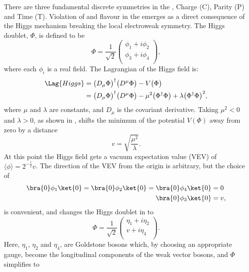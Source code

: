 There are three fundamental discrete symmetries in the \sm, Charge (C), Parity (P) and Time (T).
Violation of \CP and flavour in the \sm emerges as a direct consequence of the Higgs mechanism
breaking the local electroweak symmetry.
The Higgs doublet, $\Phi$, is defined to be
\begin{equation}
  \Phi = \frac{1}{\sqrt{2}}
  \begin{pmatrix}
    \phi_1 + i\phi_2 \\
    \phi_3 + i\phi_4 \\
  \end{pmatrix},
  \label{eq:th:phi}
\end{equation}
where each $\phi_i$ is a real field.
The Lagrangian of the Higgs field is:
\begin{align}
  \Lag{Higgs}
  &= \big(D_\mu\Phi\big)^\dagger\big(D^\mu\Phi\big) - V\big(\Phi\big) \nonumber\\
  &= \big(D_\mu\Phi\big)^\dagger\big(D^\mu\Phi\big) - \mu^2\big(\Phi^\dagger\Phi\big) +
  \lambda\big(\Phi^\dagger\Phi\big)^{2},
  \label{eq:th:laghiggs1}
\end{align}
where $\mu$ and $\lambda$ are constants, and $D_\mu$ is the covariant derivative.
Taking $\mu^2<0$ and $\lambda>0$,
as shown in ,
shifts the minimum of the potential $V(\Phi)$ away from zero by a
distance
\begin{equation}
  v = \sqrt{\frac{\mu^2}{\lambda}}.
\end{equation}
At this point the Higgs field gets a vacuum expectation value (VEV)
of $\langle\phi\rangle = 2^{-\tfrac{1}{2}}v$.
The direction of the VEV from the origin is arbitrary, but the choice of
\begin{align}
  \bra{0}\phi_1\ket{0} =
  \bra{0}\phi_2\ket{0} =
  \bra{0}\phi_4\ket{0} &= 0 \nonumber\\
  \bra{0}\phi_3\ket{0} &= v,
\end{align}
is convenient, and changes the Higgs doublet in  to
\begin{equation}
  \Phi = \frac{1}{\sqrt{2}}
  \begin{pmatrix}
    \eta_1 + i\eta_2 \\
    v + i\eta_4 \\
  \end{pmatrix}.
  \label{eq:th:eta}
\end{equation}
Here, $\eta_1$, $\eta_2$ and $\eta_4$, are Goldstone bosons which, by choosing an appropriate
gauge, become the longitudinal components of the weak vector bosons, and $\Phi$ simplifies to
